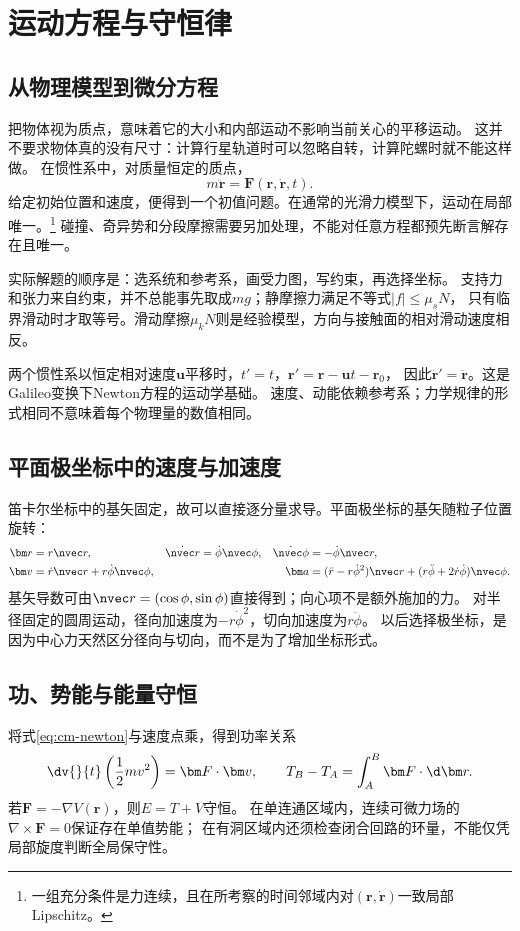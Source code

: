 \chapter{运动方程与守恒律}

\section{从物理模型到微分方程}
把物体视为质点，意味着它的大小和内部运动不影响当前关心的平移运动。
这并不要求物体真的没有尺寸：计算行星轨道时可以忽略自转，计算陀螺时就不能这样做。
在惯性系中，对质量恒定的质点，
\begin{equation}
 m\ddot{\bm r}=\bm F(\bm r,\dot{\bm r},t).
 \label{eq:cm-newton}
\end{equation}
给定初始位置和速度，便得到一个初值问题。在通常的光滑力模型下，运动在局部唯一。\footnote{一组充分条件是力连续，且在所考察的时间邻域内对$(\bm r,\dot{\bm r})$一致局部Lipschitz。}
碰撞、奇异势和分段摩擦需要另加处理，不能对任意方程都预先断言解存在且唯一。

实际解题的顺序是：选系统和参考系，画受力图，写约束，再选择坐标。
支持力和张力来自约束，并不总能事先取成$mg$；静摩擦力满足不等式$|f|\leq\mu_s N$，
只有临界滑动时才取等号。滑动摩擦$\mu_kN$则是经验模型，方向与接触面的相对滑动速度相反。

两个惯性系以恒定相对速度$\bm u$平移时，$t'=t$，$\bm r'=\bm r-\bm u t-\bm r_0$，
因此$\ddot{\bm r}'=\ddot{\bm r}$。这是Galileo变换下Newton方程的运动学基础。
速度、动能依赖参考系；力学规律的形式相同不意味着每个物理量的数值相同。

\section{平面极坐标中的速度与加速度}
笛卡尔坐标中的基矢固定，故可以直接逐分量求导。平面极坐标的基矢随粒子位置旋转：
\begin{align}
 \bm r&=r\nvec r,&
 \dot{\nvec r}&=\dot\phi\nvec\phi,&
 \dot{\nvec\phi}&=-\dot\phi\nvec r,\\
 \bm v&=\dot r\nvec r+r\dot\phi\nvec\phi,&&&
 \bm a&=(\ddot r-r\dot\phi^2)\nvec r
 +(r\ddot\phi+2\dot r\dot\phi)\nvec\phi.
 \label{eq:cm-polar-a}
\end{align}
基矢导数可由$\nvec r=(\cos\phi,\sin\phi)$直接得到；向心项不是额外施加的力。
对半径固定的圆周运动，径向加速度为$-r\dot\phi^2$，切向加速度为$r\ddot\phi$。
以后选择极坐标，是因为中心力天然区分径向与切向，而不是为了增加坐标形式。

\section{功、势能与能量守恒}
将式\eqref{eq:cm-newton}与速度点乘，得到功率关系
\begin{equation}
 \dv{}{t}\left(\frac12m v^2\right)=\bm F\cdot\bm v,
 \qquad T_B-T_A=\int_A^B\bm F\cdot\d\bm r.
\end{equation}
若$\bm F=-\nabla V(\bm r)$，则$E=T+V$守恒。
在单连通区域内，连续可微力场的$\nabla\times\bm F=0$保证存在单值势能；
在有洞区域内还须检查闭合回路的环量，不能仅凭局部旋度判断全局保守性。

